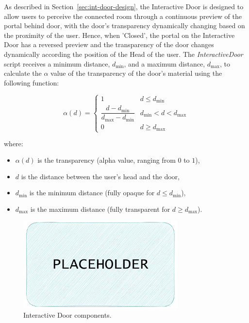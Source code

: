 As described in Section~\ref{sec:int-door-design}, the Interactive Door is designed to allow users to perceive the connected room through 
a continuous preview of the portal behind door, with the door's transparency dynamically changing based on the proximity of the user.
Hence, when 'Closed', the portal on the Interactive Door has a reversed preview and the transparency of the door changes dynamically according 
the position of the Head of the user.
The \textit{InteractiveDoor} script receives a minimum distance, $d_{\min}$, and a maximum distance, $d_{\max}$, to calculate the $\alpha$ value 
of the transparency of the door's material using the following function:

\[
\alpha(d) =
\begin{cases}
1 & d \le d_{\min} \\[6pt]
\dfrac{d - d_{\min}}{d_{\max} - d_{\min}} & d_{\min} < d < d_{\max} \\[10pt]
0 & d \ge d_{\max}
\end{cases}
\]

where:
\begin{itemize}
  \item $\alpha(d)$ is the transparency (alpha value, ranging from $0$ to $1$),
  \item $d$ is the distance between the user's head and the door,
  \item $d_{\min}$ is the minimum distance (fully opaque for $d \le d_{\min}$),
  \item $d_{\max}$ is the maximum distance (fully transparent for $d \ge d_{\max}$).
\end{itemize}

\begin{figure}[t]
    \centering
     \includegraphics[width=0.75\textwidth]{NOVAthesisFiles/Images/placeholder.pdf}
     \caption[Interactive Door components.]
     {Interactive Door components.}
     \label{fig:int-door-comp}
\end{figure}


